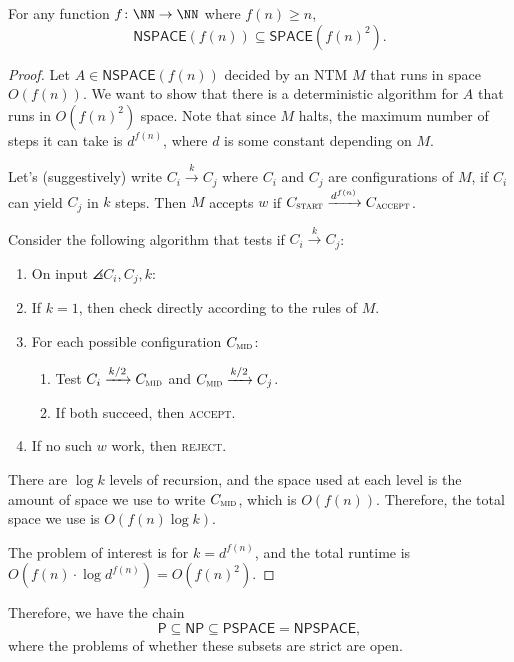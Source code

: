 \documentclass{standalone}
\begin{document}
\begin{theorem}[Savitch]
	For any function \(f \colon \NN \to \NN\) where \(f(n) \geq n\),
	\[
		\mathsf{NSPACE}(f(n)) \subseteq \mathsf{SPACE}(f(n)^2).
	\]
\end{theorem}
\begin{proof}
	Let \(A \in \mathsf{NSPACE}(f(n))\) decided by an \textsf{NTM} \(M\) that runs in space \(O(f(n))\). We want to show that there is a deterministic algorithm for \(A\) that runs in \(O(f(n)^2)\) space. Note that since \(M\) halts, the maximum number of steps it can take is \(d^{f(n)}\), where \(d\) is some constant depending on \(M\).

	Let's (suggestively) write \(C_i \xrightarrow{k} C_j\) where \(C_i\) and \(C_j\) are configurations of \(M\), if \(C_i\) can yield \(C_j\) in \(k\) steps. Then \(M\) accepts \(w\) if \(C_{\textsc{start}} \xrightarrow{d^{f(n)}} C_{\textsc{accept}}\).

	Consider the following algorithm that tests if \(C_i \xrightarrow{k} C_j\):
	\begin{enumerate}[start=0]
		\item On input \(\angles{C_i, C_j, k}\):
		\item If \(k = 1\), then check directly according to the rules of \(M\).
		\item For each possible configuration \(C_{\textsc{mid}}\):
		\begin{enumerate}[nosep]
			\item Test \(C_i \xrightarrow{k/2} C_{\textsc{mid}}\) and \(C_{\textsc{mid}} \xrightarrow{k/2} C_j\).
			\item If both succeed, then \textsc{accept}.
		\end{enumerate}
		\item If no such \(w\) work, then \textsc{reject}.
	\end{enumerate}
	There are \(\log k\) levels of recursion, and the space used at each level is the amount of space we use to write \(C_{\textsc{mid}}\), which is \(O(f(n))\). Therefore, the total space we use is \(O(f(n)\log k)\).

	The problem of interest is for \(k = d^{f(n)}\), and the total runtime is \(O(f(n) \cdot \log d^{f(n)}) = O(f(n)^2)\).
\end{proof}

Therefore, we have the chain
\[
	\mathsf{P} \subseteq \mathsf{NP} \subseteq \mathsf{PSPACE} = \mathsf{NPSPACE},
\]
where the problems of whether these subsets are strict are open.
\end{document}
